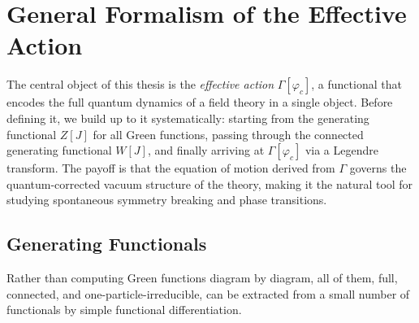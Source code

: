 \chapter{General Formalism of the Effective Action}
\label{ch:eff-action-general}

The central object of this thesis is the \emph{effective action} $\Gamma[\varphi_c]$,
a functional that encodes the full quantum dynamics of a field theory in a single
object. Before defining it, we build up to it systematically: starting from the
generating functional $Z[J]$ for all Green functions, passing through the
connected generating functional $W[J]$, and finally arriving at $\Gamma[\varphi_c]$
via a Legendre transform. The payoff is that the equation of motion derived from
$\Gamma$ governs the quantum-corrected vacuum structure of the theory, making it
the natural tool for studying spontaneous symmetry breaking and phase transitions.


\section{Generating Functionals}
\label{sec:generating-functionals}

Rather than computing Green functions diagram by diagram, all of them, full,
connected, and one-particle-irreducible, can be extracted from a small number
of functionals by simple functional differentiation.

